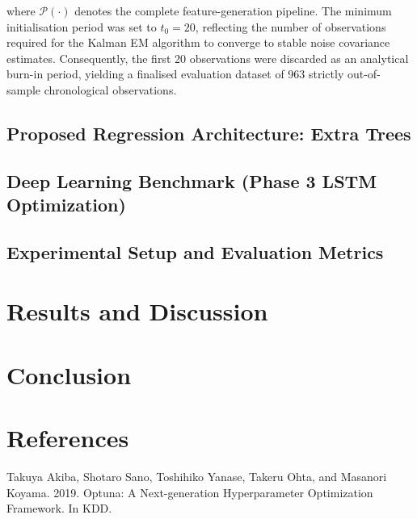 \documentclass[conference]{IEEEtran}
\begin{document}
where $\mathcal{P}(\cdot)$ denotes the complete feature-generation pipeline. The minimum initialisation period was set to $t_0 = 20$, reflecting the number of observations required for the Kalman EM algorithm to converge to stable noise covariance estimates. Consequently, the first 20 observations were discarded as an analytical burn-in period, yielding a finalised evaluation dataset of 963 strictly out-of-sample chronological observations.

\subsection{Proposed Regression Architecture: Extra Trees}


\subsection{Deep Learning Benchmark (Phase 3 LSTM Optimization)}


\subsection{Experimental Setup and Evaluation Metrics}


\section{Results and Discussion}


\section{Conclusion}

\section{References}

Takuya Akiba, Shotaro Sano, Toshihiko Yanase, Takeru Ohta, and Masanori Koyama. 2019.
	Optuna: A Next-generation Hyperparameter Optimization Framework. In KDD.


\end{document}
